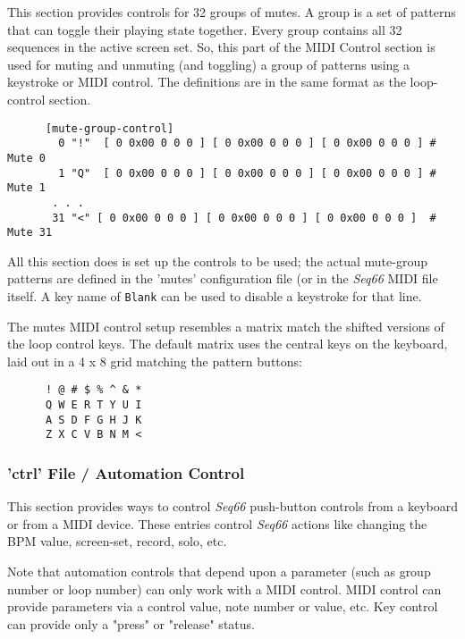    This section provides controls for 32 groups of mutes.
   A group is a set of patterns that can toggle their playing state
   together.  Every group contains all 32 sequences in the active screen set.
   So, this part of the MIDI Control section is used for muting and unmuting
   (and toggling) a group of patterns using a keystroke or MIDI control.
   The definitions are in the same format as the loop-control section.

   \begin{verbatim}
      [mute-group-control]
        0 "!"  [ 0 0x00 0 0 0 ] [ 0 0x00 0 0 0 ] [ 0 0x00 0 0 0 ] # Mute 0
        1 "Q"  [ 0 0x00 0 0 0 ] [ 0 0x00 0 0 0 ] [ 0 0x00 0 0 0 ] # Mute 1
       . . .
       31 "<" [ 0 0x00 0 0 0 ] [ 0 0x00 0 0 0 ] [ 0 0x00 0 0 0 ]  # Mute 31
   \end{verbatim}

   All this section does is set up the controls to be used; the actual
   mute-group patterns are defined in the 'mutes' configuration file (or in the
   \textsl{Seq66} MIDI file itself.
   A key name of \texttt{Blank} can be used to disable a keystroke for
   that line.

   The mutes MIDI control setup resembles a matrix match the shifted versions
   of the loop control keys.  The default matrix
   uses the central keys on the keyboard, laid out in a 4 x 8 grid matching the
   pattern buttons:

   \begin{verbatim}
      ! @ # $ % ^ & *
      Q W E R T Y U I
      A S D F G H J K
      Z X C V B N M <
   \end{verbatim}

\subsubsection{'ctrl' File / Automation Control}
\label{subsubsec:configuration_midi_ctrl_automation}

   This section provides ways to control \textsl{Seq66} push-button controls
   from a keyboard or from a MIDI device.
   These entries control
   \textsl{Seq66} actions like changing the BPM value, screen-set,
   record, solo, etc.

   Note that automation controls that depend upon a parameter (such as group
   number or loop number) can only work with a MIDI control.
   MIDI control can provide parameters via a control value, note number or value,
   etc.
   Key control can provide only a "press" or "release" status.
   
